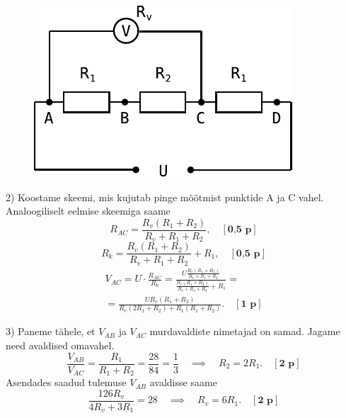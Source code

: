 \documentclass[11pt,a5paper]{article}
\newcommand{\p}[1]{[\textbf{#1~p}]}
\begin{document}
\begin{figure}
\vspace{-1em}
  \begin{center}
    \includegraphics[width=1\linewidth]{ahelad_efo3.pdf}
  \end{center}
\end{figure}

2) Koostame skeemi, mis kujutab pinge mõõtmist punktide A ja C vahel. Analoogiliselt eelmise skeemiga saame
\[
R_{AC}=\frac{R_v (R_1+R_2)}{R_v + R_1+R_2}, \quad \p{0,5}
\]
\[
R_{k}=\frac{R_v (R_1+R_2)}{R_v + R_1+R_2}+R_1, \quad \p{0,5}
\]
\begin{multline*}
V_{AC}=U\cdot\frac{R_{AC}}{R_k}=\frac{U\frac{R_v (R_1+R_2)}{R_v + R_1+R_2}}{\frac{R_v (R_1+R_2)}{R_v + R_1+R_2}+R_1}=\\
=\frac{UR_v(R_1+R_2)}{R_v(2R_1+R_2)+R_1(R_1+R_2)}. \quad \p{1}
\end{multline*}

3) Paneme tähele, et $V_{AB}$ ja $V_{AC}$ murdavaldiste nimetajad on samad. Jagame need avaldised omavahel.
\[
\frac{V_{AB}}{V_{AC}}=\frac{R_1}{R_1+R_2}=\frac{28}{84}=\frac{1}{3} \quad\implies\quad R_2=2R_1. \quad \p{2}
\]
Asendades saadud tulemuse $V_{AB}$ avaldisse saame
\[
\frac{126 R_v}{4R_v+3R_1}=28\quad\implies\quad R_v=6R_1. \quad \p{2}
\]
\end{document}
